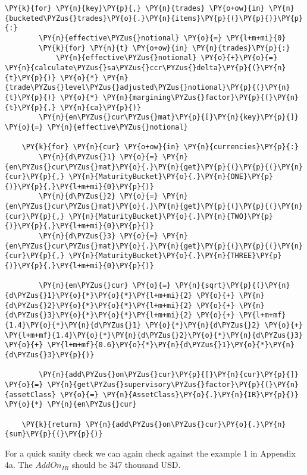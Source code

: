 \begin{tcolorbox}[breakable, size=fbox, boxrule=1pt, pad at break*=1mm,colback=cellbackground, colframe=cellborder]
\begin{Verbatim}[commandchars=\\\{\}]
    \PY{k}{for} \PY{n}{key}\PY{p}{,} \PY{n}{trades} \PY{o+ow}{in} \PY{n}{bucketed\PYZus{}trades}\PY{o}{.}\PY{n}{items}\PY{p}{(}\PY{p}{)}\PY{p}{:}
        \PY{n}{effective\PYZus{}notional} \PY{o}{=} \PY{l+m+mi}{0}
        \PY{k}{for} \PY{n}{t} \PY{o+ow}{in} \PY{n}{trades}\PY{p}{:}
            \PY{n}{effective\PYZus{}notional} \PY{o}{+}\PY{o}{=} \PY{n}{calculate\PYZus{}sa\PYZus{}ccr\PYZus{}delta}\PY{p}{(}\PY{n}{t}\PY{p}{)} \PY{o}{*} \PY{n}{trade\PYZus{}level\PYZus{}adjusted\PYZus{}notional}\PY{p}{(}\PY{n}{t}\PY{p}{)} \PY{o}{*} \PY{n}{margining\PYZus{}factor}\PY{p}{(}\PY{n}{t}\PY{p}{,} \PY{n}{ca}\PY{p}{)}
        \PY{n}{en\PYZus{}cur\PYZus{}mat}\PY{p}{[}\PY{n}{key}\PY{p}{]} \PY{o}{=} \PY{n}{effective\PYZus{}notional}
        
    \PY{k}{for} \PY{n}{cur} \PY{o+ow}{in} \PY{n}{currencies}\PY{p}{:}
        \PY{n}{d\PYZus{}1} \PY{o}{=} \PY{n}{en\PYZus{}cur\PYZus{}mat}\PY{o}{.}\PY{n}{get}\PY{p}{(}\PY{p}{(}\PY{n}{cur}\PY{p}{,} \PY{n}{MaturityBucket}\PY{o}{.}\PY{n}{ONE}\PY{p}{)}\PY{p}{,}\PY{l+m+mi}{0}\PY{p}{)}
        \PY{n}{d\PYZus{}2} \PY{o}{=} \PY{n}{en\PYZus{}cur\PYZus{}mat}\PY{o}{.}\PY{n}{get}\PY{p}{(}\PY{p}{(}\PY{n}{cur}\PY{p}{,} \PY{n}{MaturityBucket}\PY{o}{.}\PY{n}{TWO}\PY{p}{)}\PY{p}{,}\PY{l+m+mi}{0}\PY{p}{)}
        \PY{n}{d\PYZus{}3} \PY{o}{=} \PY{n}{en\PYZus{}cur\PYZus{}mat}\PY{o}{.}\PY{n}{get}\PY{p}{(}\PY{p}{(}\PY{n}{cur}\PY{p}{,} \PY{n}{MaturityBucket}\PY{o}{.}\PY{n}{THREE}\PY{p}{)}\PY{p}{,}\PY{l+m+mi}{0}\PY{p}{)}
        
        \PY{n}{en\PYZus{}cur} \PY{o}{=} \PY{n}{sqrt}\PY{p}{(}\PY{n}{d\PYZus{}1}\PY{o}{*}\PY{o}{*}\PY{l+m+mi}{2} \PY{o}{+} \PY{n}{d\PYZus{}2}\PY{o}{*}\PY{o}{*}\PY{l+m+mi}{2} \PY{o}{+} \PY{n}{d\PYZus{}3}\PY{o}{*}\PY{o}{*}\PY{l+m+mi}{2} \PY{o}{+} \PY{l+m+mf}{1.4}\PY{o}{*}\PY{n}{d\PYZus{}1} \PY{o}{*}\PY{n}{d\PYZus{}2} \PY{o}{+} \PY{l+m+mf}{1.4}\PY{o}{*}\PY{n}{d\PYZus{}2}\PY{o}{*}\PY{n}{d\PYZus{}3} \PY{o}{+} \PY{l+m+mf}{0.6}\PY{o}{*}\PY{n}{d\PYZus{}1}\PY{o}{*}\PY{n}{d\PYZus{}3}\PY{p}{)}
        
        \PY{n}{add\PYZus{}on\PYZus{}cur}\PY{p}{[}\PY{n}{cur}\PY{p}{]} \PY{o}{=} \PY{n}{get\PYZus{}supervisory\PYZus{}factor}\PY{p}{(}\PY{n}{assetClass} \PY{o}{=} \PY{n}{AssetClass}\PY{o}{.}\PY{n}{IR}\PY{p}{)} \PY{o}{*} \PY{n}{en\PYZus{}cur}

    \PY{k}{return} \PY{n}{add\PYZus{}on\PYZus{}cur}\PY{o}{.}\PY{n}{sum}\PY{p}{(}\PY{p}{)}
\end{Verbatim}
\end{tcolorbox}

    For a quick sanity check we can again check against the example 1 in
Appendix 4a. The \(AddOn_{IR}\) should be 347 thousand USD.

